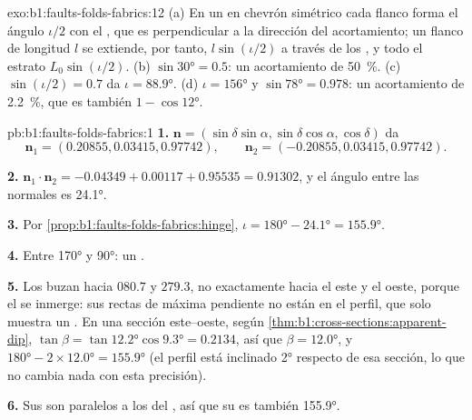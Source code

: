 \begin{solution}{exo:b1:faults-folds-fabrics:12}
(a) En un  en chevrón simétrico cada flanco forma el ángulo $\iota/2$ con el
, que es perpendicular a la dirección del acortamiento; un flanco de longitud $l$ se extiende, por tanto, $l\sin(\iota/2)$
a través de los , y todo el estrato $L_0\sin(\iota/2)$. (b) $\sin\ang{30} = 0.5$: un acortamiento de
\qty{50}{\percent}. (c) $\sin(\iota/2) = 0.7$ da $\iota = \ang{88.9}$.
(d) $\iota = \ang{156}$ y $\sin\ang{78} = 0.978$: un acortamiento de
\qty{2.2}{\percent}, que es también $1 - \cos\ang{12}$.
\end{solution}

\begin{solution}{pb:b1:faults-folds-fabrics:1}
\textbf{1.} $\mathbf n = (\sin\delta\sin\alpha, \sin\delta\cos\alpha,
\cos\delta)$ da
\[
  \mathbf n_1 = (0.20855, 0.03415, 0.97742), \qquad
  \mathbf n_2 = (-0.20855, 0.03415, 0.97742).
\]

\textbf{2.} $\mathbf n_1\cdot\mathbf n_2 = -0.04349 + 0.00117 + 0.95535 =
0.91302$, y el ángulo entre las normales es \ang{24.1}.

\textbf{3.} Por \cref{prop:b1:faults-folds-fabrics:hinge},
$\iota = \ang{180} - \ang{24.1} = \ang{155.9}$.

\textbf{4.} Entre \ang{170} y \ang{90}: un .

\textbf{5.} Los  buzan hacia $080.7$ y $279.3$, no exactamente hacia el este y el oeste, porque el  se inmerge: sus
rectas de máxima pendiente no están en el perfil, que solo muestra un . En una sección este--oeste, según
\cref{thm:b1:cross-sections:apparent-dip}, $\tan\beta = \tan\ang{12.2}
\cos\ang{9.3} = 0.2134$, así que $\beta = \ang{12.0}$, y $\ang{180} -
2\times\ang{12.0} = \ang{155.9}$ (el perfil está inclinado \ang{2} respecto de esa sección, lo que no cambia nada con esta precisión).

\textbf{6.} Sus  son paralelos a los del , así que su  es también \ang{155.9}.


\end{solution}
